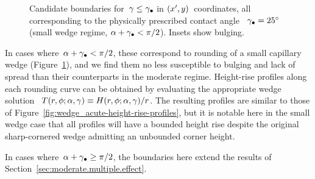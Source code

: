 \begin{figure}
  \newcommand*{\subfigurewidth}{0.31\textwidth}
  \begin{subfigure}[t]{\subfigurewidth}
  \end{subfigure}
  \hfill
  \begin{subfigure}[t]{\subfigurewidth}
  \end{subfigure}
  \hfill
  \begin{subfigure}[t]{\subfigurewidth}
  \end{subfigure}
  \caption{
    Candidate boundaries for~$\gamma \le \gamma_\bullet$
    in $(x', y)$~coordinates,
    all corresponding to the physically prescribed contact angle~%
    $\gamma_\bullet = \SI{25}{\degree}$
    (small wedge regime, $\alpha + \gamma_\bullet < \pi/2$).
    Insets show bulging.
  }
  \label{fig:wedge_small-small-candidates-offset}
\end{figure}

In cases where~$\alpha + \gamma_\bullet < \pi/2$,
these correspond to rounding of a small capillary wedge
(Figure~\ref{fig:wedge_small-small-candidates-offset}),
and we find them no less susceptible to bulging and lack of spread
than their counterparts in the moderate regime.
Height-rise profiles along each rounding curve can be obtained
by evaluating the appropriate wedge solution~%
  $T (r, \phi; \alpha, \gamma) \equiv H (r, \phi; \alpha, \gamma) / r$.
The resulting profiles are similar to those
of Figure~\ref{fig:wedge_acute-height-rise-profiles},
but it is notable here in the small wedge case
that all profiles will have a bounded height rise
despite the original sharp-cornered wedge
admitting an unbounded corner height.

In cases where~$\alpha + \gamma_\bullet \ge \pi/2$,
the boundaries here
extend the results of Section~\ref{sec:moderate.multiple.effect}.

